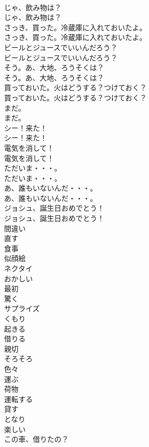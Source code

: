 \documentclass[8pt]{extreport}
\begin{document}
\begin{CJK}{UTF8}{min}
\\	じゃ、飲み物は？	
\\	じゃ、飲み物は？ 
\\	さっき、買った。冷蔵庫に入れておいたよ。	
\\	さっき、買った。冷蔵庫に入れておいたよ。 
\\	ビールとジュースでいいんだろう？	
\\	ビールとジュースでいいんだろう？ 
\\	そう。あ、大地、ろうそくは？	
\\	そう。あ、大地、ろうそくは？ 
\\	買っておいた。火はどうする？つけておく？	
\\	買っておいた。火はどうする？つけておく？ 
\\	まだ。	
\\	まだ。 
\\	シー！来た！	
\\	シー！来た！ 
\\	電気を消して！	
\\	電気を消して！ 
\\	ただいま・・・。	
\\	ただいま・・・。 
\\	あ、誰もいないんだ・・・。	
\\	あ、誰もいないんだ・・・。 
\\	ジョシュ、誕生日おめでとう！	
\\	ジョシュ、誕生日おめでとう！ 
\\	間違い
\\	直す
\\	食事
\\	似顔絵
\\	ネクタイ
\\	おかしい
\\	最初
\\	驚く
\\	サプライズ
\\	くもり
\\	起きる
\\	借りる
\\	親切
\\	そろそろ
\\	色々
\\	運ぶ
\\	荷物
\\	運転する
\\	貸す
\\	となり
\\	楽しい
\\	この車、借りたの？	

\end{CJK}
\end{document}
